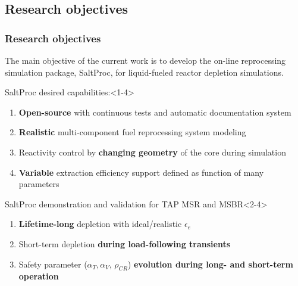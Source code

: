 \subsection{Research objectives}

\begin{frame}
  \frametitle{Research objectives}
                  \vspace*{-0.05in}
      The main objective of the current work is to develop the on-line  
      reprocessing simulation package, SaltProc, for liquid-fueled reactor     
      depletion simulations.
     \begin{block}{SaltProc desired capabilities:}<1-4>
         \begin{enumerate}
                \item \textbf{Open-source} with continuous tests and 
				automatic documentation system 
                \item \textbf{Realistic} multi-component fuel 
                reprocessing system modeling
                \item Reactivity control by \textbf{changing geometry} of 
                the core during simulation
                \item \textbf{Variable} extraction efficiency support defined 
                as function of many parameters
         \end{enumerate}
      \end{block}
            \vspace{-0.1in}
	\begin{block}{SaltProc demonstration and validation for TAP MSR and 
	MSBR}<2-4>
		\begin{enumerate}
			\item<2-4> \textbf{Lifetime-long} depletion with ideal/realistic 
			$\epsilon_e$
			\item<3-4> Short-term depletion \textbf{during load-following 
			transients}
			\item<4> Safety parameter ($\alpha_{T}, \alpha_{V}$, 
			$\rho_{CR}$) \textbf{evolution during long- and short-term 
			operation}
		\end{enumerate}
	\end{block}
\end{frame}
